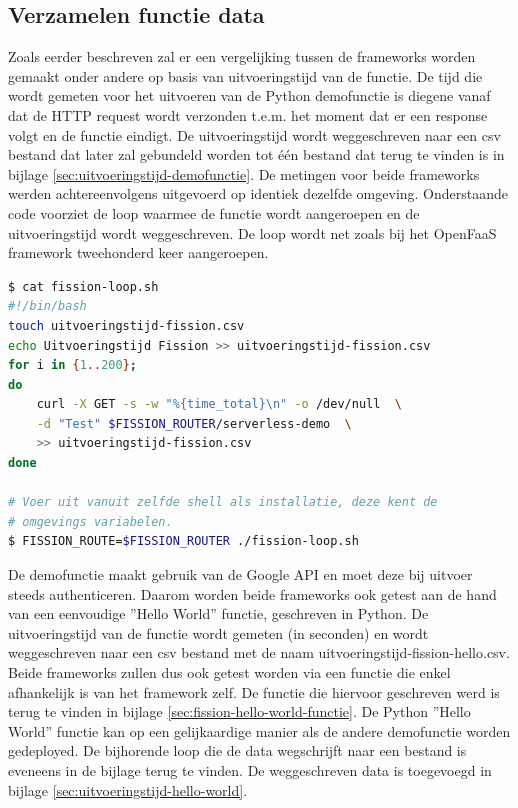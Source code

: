 \subsection{Verzamelen functie data}
Zoals eerder beschreven zal er een vergelijking tussen de frameworks worden gemaakt onder andere op basis van uitvoeringstijd van de functie. De tijd die wordt gemeten voor het uitvoeren van de Python demofunctie is diegene vanaf dat de HTTP request wordt verzonden t.e.m. het moment dat er een response volgt en de functie eindigt. De uitvoeringstijd wordt weggeschreven naar een csv bestand dat later zal gebundeld worden tot één bestand dat terug te vinden is in bijlage \ref{sec:uitvoeringstijd-demofunctie}. De metingen voor beide frameworks werden achtereenvolgens uitgevoerd op identiek dezelfde omgeving. Onderstaande code voorziet de loop waarmee de functie wordt aangeroepen en de uitvoeringstijd wordt weggeschreven. De loop wordt net zoals bij het OpenFaaS framework tweehonderd keer aangeroepen.

\begin{lstlisting}[language=bash]
$ cat fission-loop.sh
#!/bin/bash
touch uitvoeringstijd-fission.csv
echo Uitvoeringstijd Fission >> uitvoeringstijd-fission.csv
for i in {1..200};
do
    curl -X GET -s -w "%{time_total}\n" -o /dev/null  \
    -d "Test" $FISSION_ROUTER/serverless-demo  \
    >> uitvoeringstijd-fission.csv
done

# Voer uit vanuit zelfde shell als installatie, deze kent de 
# omgevings variabelen.
$ FISSION_ROUTE=$FISSION_ROUTER ./fission-loop.sh
\end{lstlisting}

De demofunctie maakt gebruik van de Google API en moet deze bij uitvoer steeds authenticeren. Daarom worden beide frameworks ook getest aan de hand van een eenvoudige ''Hello World'' functie, geschreven in Python. De uitvoeringstijd van de functie wordt gemeten (in seconden) en wordt weggeschreven naar een csv bestand met de naam uitvoeringstijd-fission-hello.csv. Beide frameworks zullen dus ook getest worden via een functie die enkel afhankelijk is van het framework zelf. De functie die hiervoor geschreven werd is terug te vinden in bijlage \ref{sec:fission-hello-world-functie}. De Python ''Hello World'' functie kan op een gelijkaardige manier als de andere demofunctie worden gedeployed. De bijhorende loop die de data wegschrijft naar een bestand is eveneens in de bijlage terug te vinden. De weggeschreven data is toegevoegd in bijlage \ref{sec:uitvoeringstijd-hello-world}.

